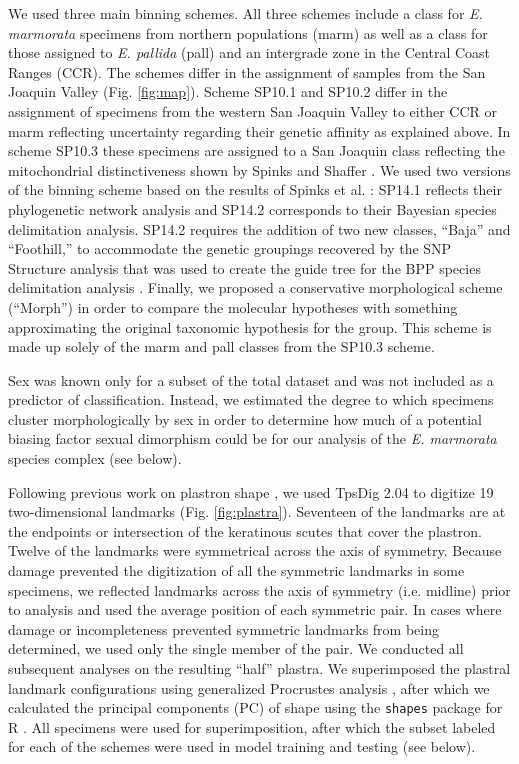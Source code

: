 \documentclass[10pt,letterpaper]{article}
\begin{document}
We used three main binning schemes. All three schemes include a class for \textit{E. marmorata} specimens from northern populations (marm) as well as a class for those assigned to \textit{E. pallida} (pall) and an intergrade zone in the Central Coast Ranges (CCR). The schemes differ in the assignment of samples from the San Joaquin Valley (Fig. \ref{fig:map}). Scheme SP10.1 and SP10.2 differ in the assignment of specimens from the western San Joaquin Valley to either CCR or marm reflecting uncertainty regarding their genetic affinity as explained above. In scheme SP10.3 these specimens are assigned to a San Joaquin class reflecting the mitochondrial distinctiveness shown by Spinks and Shaffer \cite{Spinks2005}. We used two versions of the binning scheme based on the results of Spinks et al. \cite{Spinks2014}: SP14.1 reflects their phylogenetic network analysis and SP14.2 corresponds to their Bayesian species delimitation analysis. SP14.2 requires the addition of two new classes, ``Baja'' and ``Foothill,'' to accommodate the genetic groupings recovered by the SNP Structure analysis that was used to create the guide tree for the BPP species delimitation analysis \cite{Spinks2014}. Finally, we proposed a conservative morphological scheme (``Morph'') in order to compare the molecular hypotheses with something approximating the original taxonomic hypothesis for the group. This scheme is made up solely of the marm and pall classes from the SP10.3 scheme.


Sex was known only for a subset of the total dataset and was not included as a predictor of classification. Instead, we estimated the degree to which specimens cluster morphologically by sex in order to determine how much of a potential biasing factor sexual dimorphism could be for our analysis of the \textit{E. marmorata} species complex (see below).

Following previous work on plastron shape \cite{Angielczyk2007,Angielczyk2011,Angielczyk2013a}, we used TpsDig 2.04 \cite{Rohlf2005} to digitize 19 two-dimensional landmarks (Fig. \ref{fig:plastra}). Seventeen of the landmarks are at the endpoints or intersection of the keratinous scutes that cover the plastron. Twelve of the landmarks were symmetrical across the axis of symmetry. Because damage prevented the digitization of all the symmetric landmarks in some specimens, we reflected landmarks across the axis of symmetry (i.e. midline) prior to analysis and used the average position of each symmetric pair. In cases where damage or incompleteness prevented symmetric landmarks from being determined, we used only the single member of the pair. We conducted all subsequent analyses on the resulting ``half'' plastra. We superimposed the plastral landmark configurations using generalized Procrustes analysis \cite{Dryden1998a}, after which we calculated the principal components (PC) of shape using the \texttt{shapes} package for R \cite{R2016,Dryden2013}. All specimens were used for superimposition, after which the subset labeled for each of the schemes were used in model training and testing (see below).
\end{document}
